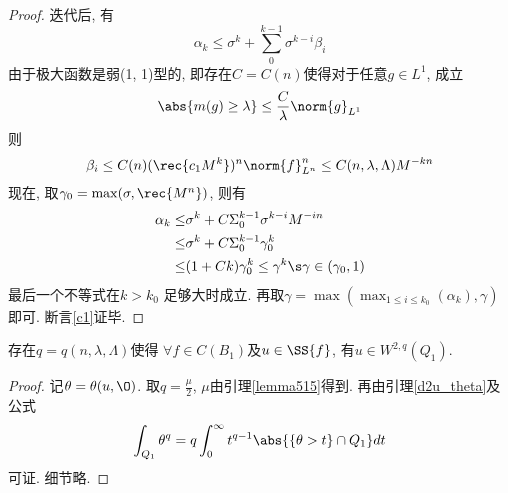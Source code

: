 \begin{proof}
    迭代后, 有 
    \begin{equation}
        \alpha_k \le \sigma^k + \sum^{k-1}_0\sigma^{k-i}\beta_i
    \end{equation}
    由于极大函数是弱(1, 1)型的, 即存在$C=C(n)$使得对于任意$g \in L^1$, 成立
    \begin{equation}
        \abs{m(g) \ge \lambda} \le \frac{C}{\lambda}\norm{g}_{L^1}
    \end{equation}
    则
    \begin{equation}
        \beta_i \le C(n)(\rec{c_1M^k})^n\norm{f}^n_{L^n} \le C(n, \lambda, \Lambda)M^{-kn}
    \end{equation}
    现在, 取$\gamma_0=\max(\sigma, \rec{M^n})$, 则有
    \begin{equation}
        \begin{split}
            \alpha_k \le & \sigma^k+C\Sigma^{k-1}_0\sigma^{k-i}M^{-in} \\
            \le & \sigma^k+C\Sigma^{k-1}_0\gamma_0^k\\
            \le & (1+Ck)\gamma_0^k \le \gamma^k \s \gamma \in (\gamma_0, 1)
        \end{split}
    \end{equation}
    最后一个不等式在$k>k_0$ 足够大时成立.  再取$\gamma=\max(\max_{1\le i \le k_0}(\alpha_k), \gamma)$即可.  断言\eqref{c1}证毕.  
\end{proof}
\begin{corollary}
    存在$q=q(n, \lambda, \Lambda)$使得 $\forall f \in C(B_1)$及$u \in \SS{f}$, 有$u \in W^{2, q}(Q_1)$.  
\end{corollary}
\begin{proof}
    记$\theta=\theta(u, \O)$.  取$q=\frac{\mu}{2}$, $\mu$由引理\eqref{lemma515}得到.  再由引理\eqref{d2u_theta}及公式
    \begin{equation}
        \int_{Q_1}\theta^q = q\int^\infty_0t^{q-1}\abs{\{\theta>t\} \cap Q_1} dt
    \end{equation}
    可证.  细节略.  
\end{proof}
